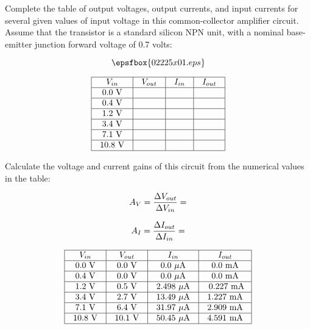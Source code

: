 

Complete the table of output voltages, output currents, and input currents for several given values of input voltage in this common-collector amplifier circuit.  Assume that the transistor is a standard silicon NPN unit, with a nominal base-emitter junction forward voltage of 0.7 volts:

$$\epsfbox{02225x01.eps}$$


$$\vbox{\offinterlineskip
\halign{\strut
\vrule \quad\hfil # \ \hfil & 
\vrule \quad\hfil # \ \hfil & 
\vrule \quad\hfil # \ \hfil & 
\vrule \quad\hfil # \ \hfil \vrule \cr
\noalign{\hrule}
%
$V_{in}$ & $V_{out}$ & $I_{in}$ & $I_{out}$ \cr
%
\noalign{\hrule}
%
0.0 V &  &  & \cr
%
\noalign{\hrule}
%
0.4 V &  &  & \cr
%
\noalign{\hrule}
%
1.2 V &  &  & \cr
%
\noalign{\hrule}
%
3.4 V &  &  & \cr
%
\noalign{\hrule}
%
7.1 V &  &  & \cr
%
\noalign{\hrule}
%
10.8 V &  &  & \cr
%
\noalign{\hrule}
} %
}$$ %

Calculate the voltage and current gains of this circuit from the numerical values in the table:

$$A_V = {\Delta V_{out} \over \Delta V_{in}} = $$

$$A_I = {\Delta I_{out} \over \Delta I_{in}} = $$








$$\vbox{\offinterlineskip
\halign{\strut
\vrule \quad\hfil # \ \hfil & 
\vrule \quad\hfil # \ \hfil & 
\vrule \quad\hfil # \ \hfil & 
\vrule \quad\hfil # \ \hfil \vrule \cr
\noalign{\hrule}
%
$V_{in}$ & $V_{out}$ & $I_{in}$ & $I_{out}$ \cr
%
\noalign{\hrule}
%
0.0 V & 0.0 V & 0.0 $\mu$A & 0.0 mA \cr
%
\noalign{\hrule}
%
0.4 V & 0.0 V & 0.0 $\mu$A & 0.0 mA \cr
%
\noalign{\hrule}
%
1.2 V & 0.5 V & 2.498 $\mu$A & 0.227 mA\cr
%
\noalign{\hrule}
%
3.4 V & 2.7 V & 13.49 $\mu$A & 1.227 mA \cr
%
\noalign{\hrule}
%
7.1 V & 6.4 V & 31.97 $\mu$A & 2.909 mA \cr
%
\noalign{\hrule}
%
10.8 V & 10.1 V & 50.45 $\mu$A & 4.591 mA \cr
%
\noalign{\hrule}
} %
}$$ %


